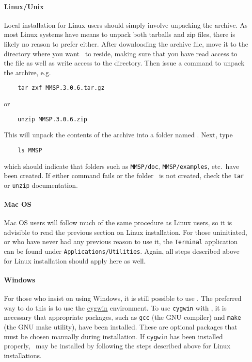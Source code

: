 \paragraph{Linux/Unix}
Local installation for Linux users should simply involve unpacking the archive.  As most Linux systems have means to unpack both tarballs and zip files, there is likely no reason to prefer either.  After downloading the archive file, move it to the directory where you want \MMSP\ to reside, making sure that you have read access to the file as well as write access to the directory.  Then issue a command to unpack the archive, e.g.
\begin{shadebox}
\begin{verbatim}
    tar zxf MMSP.3.0.6.tar.gz
\end{verbatim}
\end{shadebox}
or
\begin{shadebox}
\begin{verbatim}
    unzip MMSP.3.0.6.zip
\end{verbatim}
\end{shadebox}
This will unpack the contents of the archive into a folder named \MMSP.  Next, type
\begin{shadebox}
\begin{verbatim}
    ls MMSP
\end{verbatim}
\end{shadebox}
which should indicate that folders such as {\tt MMSP/doc}, {\tt MMSP/examples}, etc.~have been created.  If either command fails or the folder \MMSP\ is not created, check the {\tt tar} or {\tt unzip} documentation.

\paragraph{Mac OS}
Mac OS users will follow much of the same procedure as Linux users, so it is advisible to read the previous section on Linux installation.  For those uninitiated, or who have never had any previous reason to use it, the {\tt Terminal} application can be found under {\tt Applications/Utilities}.  Again, all steps described above for Linux installation should apply here as well.

\paragraph{Windows}
For those who insist on using Windows, it is still possible to use \MMSP.  The preferred way to do this is to use the \href{http://www.cygwin.com}{cygwin} environment.  To use {\tt cygwin} with \MMSP, it is necessary that appropriate packages, such as {\tt gcc} (the GNU compiler) and {\tt make} (the GNU make utility), have been installed.  These are optional packages that must be chosen manually during installation.  If {\tt cygwin} has been installed properly, \MMSP\ may be installed by following the steps described above for Linux installations.

